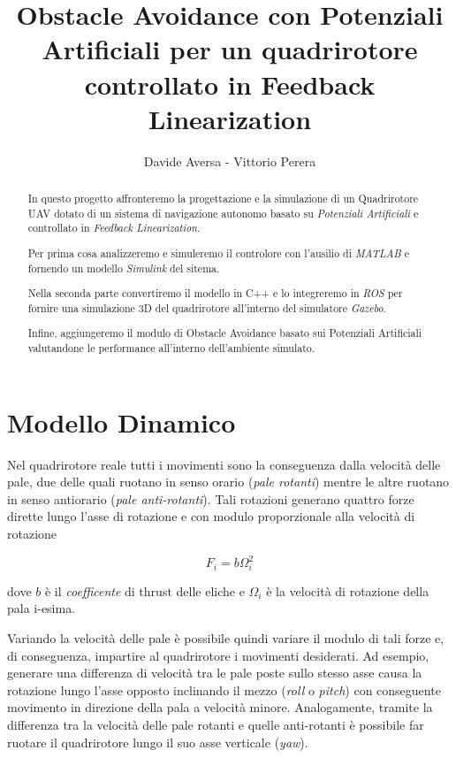 \documentclass[a4paper,10pt]{article}
\title{Obstacle Avoidance con Potenziali Artificiali per un quadrirotore controllato in Feedback Linearization}
\author{Davide Aversa - Vittorio Perera}
\begin{document}
\maketitle

\begin{abstract}

In questo progetto affronteremo la progettazione e la simulazione di un Quadrirotore UAV dotato di un sistema di navigazione autonomo basato su \emph{Potenziali Artificiali} e controllato in \emph{Feedback Linearization}.

Per prima cosa analizzeremo e simuleremo il controlore con l'ausilio di \emph{MATLAB} e fornendo un modello \emph{Simulink} del sitema.

Nella seconda parte convertiremo il modello in C++ e lo integreremo in \emph{ROS} per fornire una simulazione 3D del quadrirotore all'interno del simulatore \emph{Gazebo}.

Infine, aggiungeremo il modulo di Obstacle Avoidance basato sui Potenziali Artificiali valutandone le performance all'interno dell'ambiente simulato.

\end{abstract}

\section{Modello Dinamico}

Nel quadrirotore reale tutti i movimenti sono la conseguenza dalla velocità delle pale, due delle quali ruotano in senso orario (\emph{pale rotanti}) mentre le altre ruotano in senso antiorario (\emph{pale anti-rotanti}). Tali rotazioni generano quattro forze dirette lungo l'asse di rotazione e con modulo proporzionale alla velocità di rotazione

\begin{equation}
F_i = b \Omega_i^2
\end{equation}

dove $b$ è il \emph{coefficente} di thrust delle eliche e $\Omega_i$ è la velocità di rotazione della pala i-esima.

Variando la velocità delle pale è possibile quindi variare il modulo di tali forze e, di conseguenza, impartire al quadrirotore i movimenti desiderati. Ad esempio, generare una differenza di velocità tra le pale poste sullo stesso asse causa la rotazione lungo l'asse opposto inclinando il mezzo (\emph{roll} o \emph{pitch}) con conseguente movimento in direzione della pala a velocità minore. Analogamente, tramite la differenza tra la velocità delle pale rotanti e quelle anti-rotanti è possibile far ruotare il quadrirotore lungo il suo asse verticale (\emph{yaw}).
\end{document}
